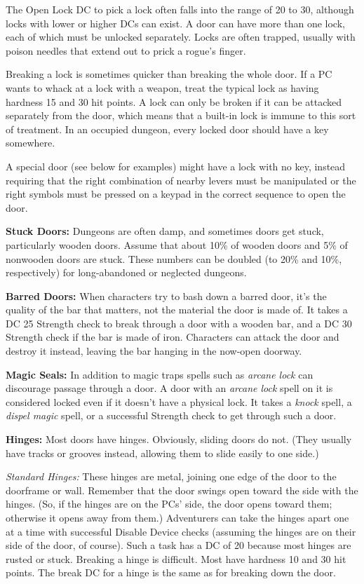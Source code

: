 \documentclass{article}
\begin{document}
The Open Lock DC to pick a lock often falls into the range of 20 to 30, although 
locks with lower or higher DCs can exist. A door can have more than one lock, each 
of which must be unlocked separately. Locks are often trapped, usually with poison 
needles that extend out to prick a rogue's finger.

Breaking a lock is sometimes quicker than breaking the whole door. If a PC wants 
to whack at a lock with a weapon, treat the typical lock as having hardness 15 
and 30 hit points. A lock can only be broken if it can be attacked separately from 
the door, which means that a built-in lock is immune to this sort of treatment. 
In an occupied dungeon, every locked door should have a key somewhere. 

A special door (see below for examples) might have a lock with no key, instead 
requiring that the right combination of nearby levers must be manipulated or the 
right symbols must be pressed on a keypad in the correct sequence to open the door.

\textbf{Stuck Doors: }Dungeons are often damp, and sometimes doors get stuck, particularly 
wooden doors. Assume that about 10\% of wooden doors and 5\% of nonwooden doors 
are stuck. These numbers can be doubled (to 20\% and 10\%, respectively) for long-abandoned 
or neglected dungeons.

\textbf{Barred Doors: }When characters try to bash down a barred door, it's the 
quality of the bar that matters, not the material the door is made of. It takes 
a DC 25 Strength check to break through a door with a wooden bar, and a DC 30 Strength 
check if the bar is made of iron. Characters can attack the door and destroy it 
instead, leaving the bar hanging in the now-open doorway.

\textbf{Magic Seals:} In addition to magic traps spells such as \textit{arcane 
lock }can discourage passage through a door. A door with an \textit{arcane lock 
}spell on it is considered locked even if it doesn't have a physical lock. It takes 
a \textit{knock }spell, a \textit{dispel magic }spell, or a successful Strength 
check  to get through such a door.

\textbf{Hinges:} Most doors have hinges. Obviously, sliding doors do not. (They 
usually have tracks or grooves instead, allowing them to slide easily to one side.)

\textit{Standard Hinges: }These hinges are metal, joining one edge of the door 
to the doorframe or wall. Remember that the door swings open toward the side with 
the hinges. (So, if the hinges are on the PCs' side, the door opens toward them; 
otherwise it opens away from them.) Adventurers can take the hinges apart one at 
a time with successful Disable Device checks (assuming the hinges are on their 
side of the door, of course). Such a task has a DC of 20 because most hinges are 
rusted or stuck. Breaking a hinge is difficult. Most have hardness 10 and 30 hit 
points. The break DC for a hinge is the same as for breaking down the door.
\end{document}

